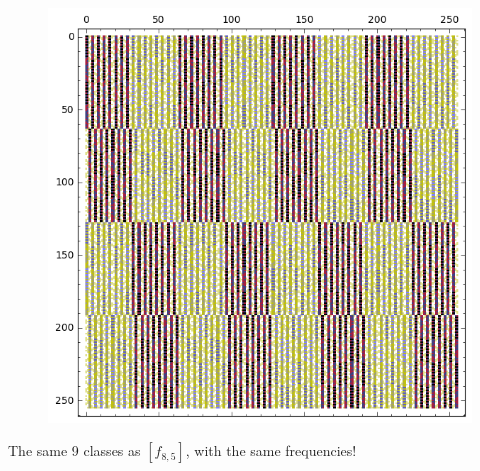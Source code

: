 \documentclass[pdf,sprung,slideColor,nocolorBG]{beamer}
\newenvironment{colortheme}[1]{
\def\ProvidesPackageRCS $##1${\relax}
\renewcommand{\ProcessOptions}{\relax}
\makeatletter

\makeatother
}{}
\begin{document}
\begin{colortheme}{jubata}
\begin{frame}
\begin{figure}
\begin{minipage}{.48\textwidth}
  \label{fig:8_6_weight_class_matrix}
\end{minipage}%
\begin{minipage}{.48\textwidth}
  \centering
  \includegraphics[width=.9\linewidth]{../matrix_plot/re8_6_bent_cayley_graph_index_matrix.png}
  \label{fig:8_6_bent_cayley_graph_index_matrix}
\end{minipage}
\end{figure}
The same 9 classes as $[f_{8,5}]$, with the same frequencies!
\end{frame}

\end{colortheme}
\end{document}
